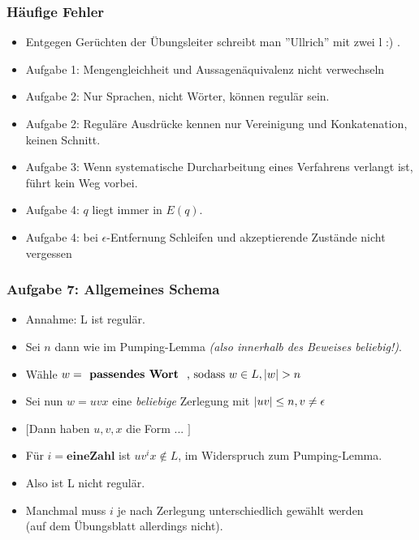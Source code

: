 \begin{frame}
	\frametitle{Häufige Fehler}		
		\begin{itemize}
			\item Entgegen Gerüchten der Übungsleiter schreibt man ''Ullrich'' mit zwei l :) .\pause
            \item Aufgabe 1: Mengengleichheit und Aussagenäquivalenz nicht verwechseln \pause
            \item Aufgabe 2: Nur Sprachen, nicht Wörter, können regulär sein.
            \item Aufgabe 2: Reguläre Ausdrücke kennen nur Vereinigung und Konkatenation, keinen Schnitt. \pause
            \item Aufgabe 3: Wenn systematische Durcharbeitung eines Verfahrens verlangt ist, führt kein Weg vorbei. \pause
            \item Aufgabe 4: $q$ liegt immer in $E(q)$.
            \item Aufgabe 4: bei $\epsilon$-Entfernung Schleifen und akzeptierende Zustände nicht vergessen
        \end{itemize}
\end{frame}
\begin{frame}
	\frametitle{Aufgabe 7: Allgemeines Schema}
	
	\begin{itemize}
        \item Annahme: L ist regulär.
		\item Sei $n$ dann wie im Pumping-Lemma \emph{(also innerhalb des Beweises beliebig!)}.
		\item Wähle $w=\text{\textbf{ passendes Wort } , sodass } w\in L, \left\vert w \right\vert > n$
		\item Sei nun $w=uvx$ eine \emph{beliebige} Zerlegung mit $\left\vert uv \right\vert \le n, v\neq \epsilon$
        \item $[$Dann haben $u, v, x$ die Form ... $]$
        \item Für $i=\textbf{eineZahl}$ ist $uv^ix \not\in L$, im Widerspruch zum Pumping-Lemma.
        \item Also ist L nicht regulär.
        \vspace{1cm}
        \item Manchmal muss $i$ je nach Zerlegung unterschiedlich gewählt werden \\ (auf dem Übungsblatt allerdings nicht).
	\end{itemize}
\end{frame}



